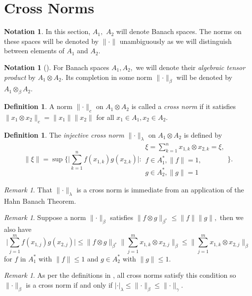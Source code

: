 \documentclass{article}
\theoremstyle{plain}
\theoremstyle{definition}
\newtheorem{definition}[theorem]{Definition}
\newtheorem{notation}[theorem]{Notation}
\theoremstyle{remark}
\newtheorem{remark}[theorem]{Remark}
\begin{document}
\section{Cross Norms}
\begin{notation}
In this section, $A_1,$ $A_2$ will denote Banach spaces.
The norms on these spaces will be denoted by $\lVert \cdot \rVert$
unambiguously as we will distinguish between elements of $A_1$ and $A_2.$
\end{notation}
\begin{notation}[]
For Banach spaces $A_1, A_2,$ we will denote their \emph{algebraic tensor product} by $A_1 \otimes A_2.$
Its completion in some norm $\lVert \cdot \rVert_\beta$ will be denoted by $A_1 \otimes_\beta A_2.$
\end{notation}
\begin{definition}
	A norm $\lVert \cdot \rVert_c$ on $A_1 \otimes A_2$
is called a \emph{cross norm} if it satisfies $\lVert x_1 \otimes x_2 \rVert_c = \lVert x_1 \rVert \lVert x_2 \rVert$
for all $x_1 \in A_1, x_2 \in A_2.$
\end{definition}
\begin{definition}
	The \emph{injective cross norm} $\lVert \cdot \rVert_\lambda$ on $A_1 \otimes A_2$ is defined by
	$$  \lVert \xi \rVert = \sup \{ \lvert\sum_{k=1}^{n} f(x_{1,k}) g(x_{2,k}) \rvert 
		\colon 
		\begin{array}{c}
		\xi = \sum_{k=1}^{n} x_{1,k}\otimes x_{2,k} = \xi, \\
		f \in A_1^\ast, \lVert f \rVert = 1, \\
		g \in A_2^\ast, \lVert g \rVert = 1
	\end{array}
\}.$$
\end{definition}
\begin{remark}
	That $\lVert \cdot \rVert_\lambda$ is a cross norm is immediate from an application of the Hahn Banach Theorem.
\end{remark}

\begin{remark}
	Suppose a norm $\lVert \cdot \rVert_{\beta}$ satisfies $\lVert f \otimes g \rVert_{\beta^\ast}
	\leq \lVert f \rVert \lVert g \rVert,$ then we also have
$$ \lvert \sum_{j=1}^{m} f(x_{1,j}) g(x_{2,j}) \rvert \leq \lVert f \otimes g  \rVert_{\beta^\ast}
\lVert \sum_{j=1}^{m} x_{1,k} \otimes x_{2,j} \rVert_{\beta} \leq 
\lVert \sum_{j=1}^{m} x_{1,k} \otimes x_{2,j} \rVert_{\beta}$$
for $f$ in $A_1^\ast$ with $\lVert f \rVert \leq 1$ and $g \in A_2^\ast$ with $\lVert g \rVert \leq 1.$
\end{remark}
\begin{remark}
	As per the definitions in \cite{Kubrusly2023}, all cross norms satisfy this condition so
	$\lVert \cdot \rVert_{\beta}$ is a cross norm if and only if $\lvert \cdot \rvert_{\lambda}
	\leq \lVert \cdot \rVert_{\beta} \leq \lVert \cdot \rVert_{ \gamma}.$
\end{remark}
\end{document}
